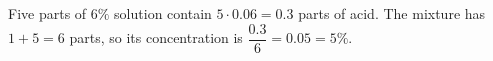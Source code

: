 Five parts of $6\%$ solution contain $5\cdot0.06=0.3$ parts of acid. The mixture has $1+5=6$ parts, so its concentration is $\dfrac{0.3}{6}=0.05=\boxed{5\%}$.
